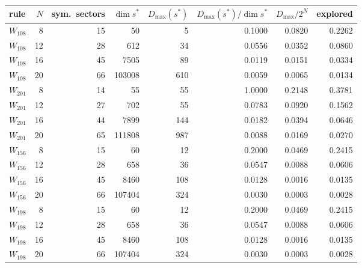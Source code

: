 \begin{tabular}{lrrrrrrr}
\toprule
rule & $N$ & sym.\ sectors & $\dim s^*$ & $D_{\max}(s^*)$ & $D_{\max}(s^*)/\dim s^*$ & $D_{\max}/2^N$ & explored \\
\midrule
$W_{108}$ & 8 & 15 & 50 & 5 & 0.1000 & 0.0820 & 0.2262 \\
$W_{108}$ & 12 & 28 & 612 & 34 & 0.0556 & 0.0352 & 0.0860 \\
$W_{108}$ & 16 & 45 & 7505 & 89 & 0.0119 & 0.0151 & 0.0334 \\
$W_{108}$ & 20 & 66 & 103008 & 610 & 0.0059 & 0.0065 & 0.0134 \\
$W_{201}$ & 8 & 14 & 55 & 55 & 1.0000 & 0.2148 & 0.3781 \\
$W_{201}$ & 12 & 27 & 702 & 55 & 0.0783 & 0.0920 & 0.1562 \\
$W_{201}$ & 16 & 44 & 7899 & 144 & 0.0182 & 0.0394 & 0.0646 \\
$W_{201}$ & 20 & 65 & 111808 & 987 & 0.0088 & 0.0169 & 0.0270 \\
$W_{156}$ & 8 & 15 & 60 & 12 & 0.2000 & 0.0469 & 0.2415 \\
$W_{156}$ & 12 & 28 & 658 & 36 & 0.0547 & 0.0088 & 0.0606 \\
$W_{156}$ & 16 & 45 & 8460 & 108 & 0.0128 & 0.0016 & 0.0135 \\
$W_{156}$ & 20 & 66 & 107404 & 324 & 0.0030 & 0.0003 & 0.0028 \\
$W_{198}$ & 8 & 15 & 60 & 12 & 0.2000 & 0.0469 & 0.2415 \\
$W_{198}$ & 12 & 28 & 658 & 36 & 0.0547 & 0.0088 & 0.0606 \\
$W_{198}$ & 16 & 45 & 8460 & 108 & 0.0128 & 0.0016 & 0.0135 \\
$W_{198}$ & 20 & 66 & 107404 & 324 & 0.0030 & 0.0003 & 0.0028 \\
\bottomrule
\end{tabular}
